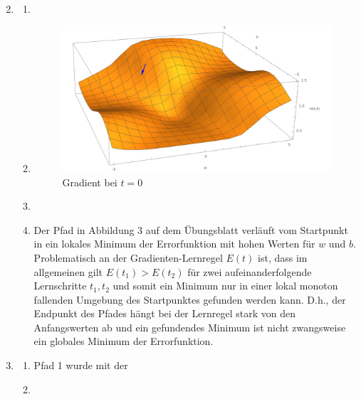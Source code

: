 \documentclass{article}
\begin{document}
\begin{enumerate}
\begin{enumerate}[label=\alph*)]
\begin{align*}
                \end{align*}
        \end{enumerate}
  \item
        \begin{enumerate}[label=\alph*)]
          \item {}
          \item {}
                \begin{figure}[H]
                  \centering
                  \includegraphics{initial-error-gradient.pdf}
                  \caption{Gradient bei $t=0$}
                \end{figure}

          \item
          \item Der Pfad in Abbildung 3 auf dem Übungsblatt verläuft vom Startpunkt in ein lokales Minimum der Errorfunktion mit hohen Werten für $w$ und $b$.  Problematisch an der Gradienten-Lernregel $E(t)$ ist, dass im allgemeinen gilt $E(t_1)>E(t_2)$ für zwei aufeinanderfolgende Lernschritte $t_1, t_2$ und somit ein Minimum nur in einer lokal monoton fallenden Umgebung des Startpunktes gefunden werden kann. D.h., der Endpunkt des Pfades hängt bei der Lernregel stark von den Anfangswerten ab und ein gefundendes Minimum ist nicht zwangsweise ein globales Minimum der Errorfunktion.
        \end{enumerate}
  \item
        \begin{enumerate}[label=\alph*)]
          \item Pfad 1 wurde mit der
          \item
        \end{enumerate}
\end{enumerate}
\end{document}
